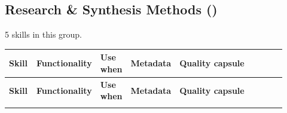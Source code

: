 \documentclass[
]{article}
\renewcommand{\arraystretch}{1.08}
\begin{document}
\subsection{\texorpdfstring{Research \& Synthesis Methods
()}{Research & Synthesis Methods (research_methods)}}\label{research-synthesis-methods-research_methods}

5 skills in this group.

\begingroup
\scriptsize
\setlength{\tabcolsep}{1.8pt}
\renewcommand{\arraystretch}{1.02}
\begin{longtable}{@{}>{\raggedright\arraybackslash}p{0.105\linewidth}>{\raggedright\arraybackslash}p{0.13\linewidth}>{\raggedright\arraybackslash}p{0.095\linewidth}>{\raggedright\arraybackslash}p{0.135\linewidth}>{\raggedright\arraybackslash}p{0.455\linewidth}@{}}
\toprule
\textbf{Skill} & \textbf{Functionality} & \textbf{Use when} & \textbf{Metadata} & \textbf{Quality capsule}\\
\midrule
\endfirsthead
\toprule
\textbf{Skill} & \textbf{Functionality} & \textbf{Use when} & \textbf{Metadata} & \textbf{Quality capsule}\\
\midrule
\endhead
\bottomrule
\endfoot

\end{longtable}
\end{document}
